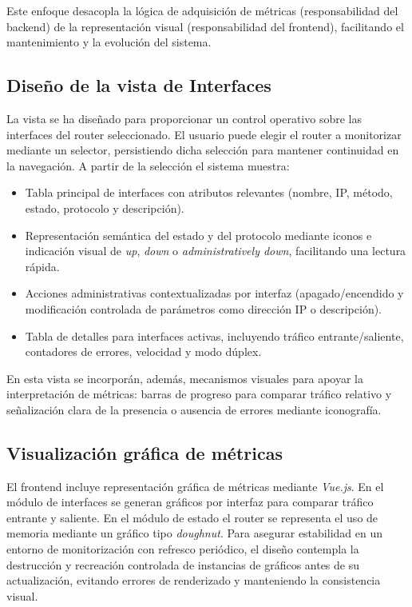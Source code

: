 Este enfoque desacopla la lógica de adquisición de métricas (responsabilidad del backend) de la representación visual (responsabilidad del frontend), facilitando el mantenimiento y la evolución del sistema.

\subsection*{Diseño de la vista de Interfaces}

La vista se ha diseñado para proporcionar un control operativo sobre las interfaces del router seleccionado. El usuario puede elegir el router a monitorizar mediante un selector, persistiendo dicha selección para mantener continuidad en la navegación. A partir de la selección el sistema muestra:

\begin{itemize}
    \item Tabla principal de interfaces con atributos relevantes (nombre, IP, método,
    estado, protocolo y descripción).
    \item Representación semántica del estado y del protocolo mediante iconos e indicación
    visual de \textit{up}, \textit{down} o \textit{administratively down}, facilitando una lectura
    rápida.
    \item Acciones administrativas contextualizadas por interfaz (apagado/encendido y
    modificación controlada de parámetros como dirección IP o descripción).
    \item Tabla de detalles para interfaces activas, incluyendo tráfico entrante/saliente,
    contadores de errores, velocidad y modo dúplex.
\end{itemize}

En esta vista se incorporán, además, mecanismos visuales para apoyar la interpretación de métricas: barras de progreso para comparar tráfico relativo y señalización clara de la presencia o ausencia de errores mediante iconografía.

\subsection*{Visualización gráfica de métricas}

El frontend incluye representación gráfica de métricas mediante \textit{Vue.js}. En el módulo de interfaces se generan gráficos por interfaz para comparar tráfico entrante y saliente. En el módulo de estado el router se representa el uso de memoria mediante un gráfico tipo \textit{doughnut}. Para asegurar estabilidad en un entorno de monitorización con refresco periódico, el diseño contempla la destrucción y recreación controlada de instancias de gráficos antes de su actualización, evitando errores de renderizado y manteniendo la consistencia visual.

